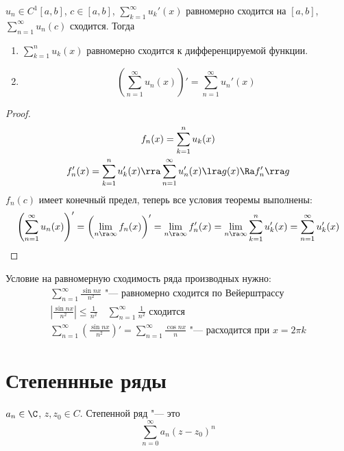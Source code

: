 \begin{conseq}
	$u_n \in C^1[a, b]$, $c \in [a, b]$, $\sum_{k=1}^\infty u_k'(x)$ равномерно сходится на $[a, b]$, $\sum_{n=1}^\infty u_n(c)$ сходится.
	Тогда
	\begin{enumerate}
		\item $\sum_{k=1}^n u_k(x)$ равномерно сходится к дифференцируемой функции.
		\item \[ \left(\sum_{n=1}^\infty u_n(x)\right)' = \sum_{n=1}^\infty u_n'(x) \]
	\end{enumerate}
\end{conseq}
\begin{proof}
	\begin{gather*}
		f_n(x) = \sum_{k=1}^n u_k(x) \\
		f_n'(x) = \sum_{k=1}^n u_k'(x) \rra \sum_{n=1}^\infty u_n'(x) \lra g(x) \Ra f_n' \rra g
	\end{gather*}
	$f_n(c)$ имеет конечный предел, теперь все условия теоремы выполнены:
	\begin{gather*}
		\left( \sum_{n=1}^\infty u_n(x) \right)'
		= \left( \lim_{n \ra \infty} f_n(x) \right)'
		= \lim_{n \ra \infty} f_n'(x)
		= \lim_{n \ra \infty} \sum_{k=1}^n u_k'(x)
		= \sum_{n=1}^\infty u_k'(x)
	\end{gather*}
\end{proof}

\begin{exmp}
	Условие на равномерную сходимость ряда производных нужно:
	\begin{gather*}
		\sum_{n=1}^\infty \frac{\sin nx}{n^2} \text{ "--- равномерно сходится по Вейерштрассу} \\
		\left|\frac{\sin nx}{n^2}\right| \le \frac1{n^2} \quad \sum_{n=1}^\infty \frac1{n^2} \text{ сходится} \\
		\sum_{n=1}^\infty \left(\frac{\sin nx}{n^2}\right)' = \sum_{n=1}^\infty \frac{\cos nx}{n} \text{ "--- расходится при $x=2\pi k$}
	\end{gather*}
\end{exmp}

\section{Степеннные ряды}

\begin{Def}
	$a_n \in \C$, $z, z_0 \in C$.
	Степенной ряд "--- это
	\[ \sum_{n=0}^\infty a_n (z - z_0)^n \]
\end{Def}

